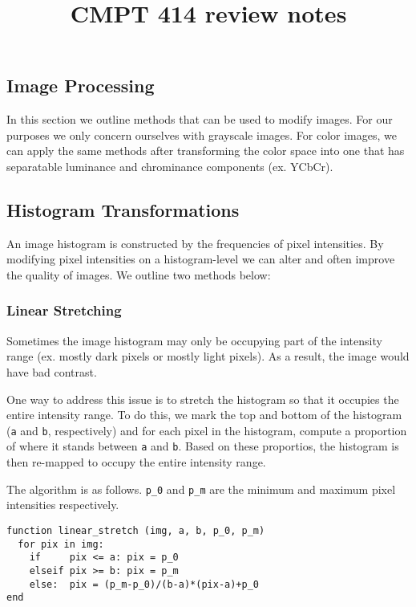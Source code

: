 \documentclass{article}
\title{CMPT 414 review notes}
\author{}
\date{}
\begin{document}
\maketitle

\begin{multicols}{2}

\section{Image Processing}

In this section we outline methods that can be used to modify images. For our purposes we only concern ourselves with grayscale images. For color images, we can apply the same methods after transforming the color space into one that has separatable luminance and chrominance components (ex. YCbCr).

\subsection{Histogram Transformations}

An image histogram is constructed by the frequencies of pixel intensities. By modifying pixel intensities on a histogram-level we can alter and often improve the quality of images. We outline two methods below:

\subsubsection{Linear Stretching}

Sometimes the image histogram may only be occupying part of the intensity range (ex. mostly dark pixels or mostly light pixels). As a result, the image would have bad contrast.

One way to address this issue is to stretch the histogram so that it occupies the entire intensity range. To do this, we mark the top and bottom of the histogram (\texttt{a} and \texttt{b}, respectively) and for each pixel in the histogram, compute a proportion of where it stands between \texttt{a} and \texttt{b}. Based on these proportios, the histogram is then re-mapped to occupy the entire intensity range.

The algorithm is as follows. \texttt{p\_0} and \texttt{p\_m} are the minimum and maximum pixel intensities respectively.

\begin{verbatim}
function linear_stretch (img, a, b, p_0, p_m)
  for pix in img:
    if     pix <= a: pix = p_0
    elseif pix >= b: pix = p_m
    else:  pix = (p_m-p_0)/(b-a)*(pix-a)+p_0
end
\end{verbatim}


\end{multicols}
\end{document}
